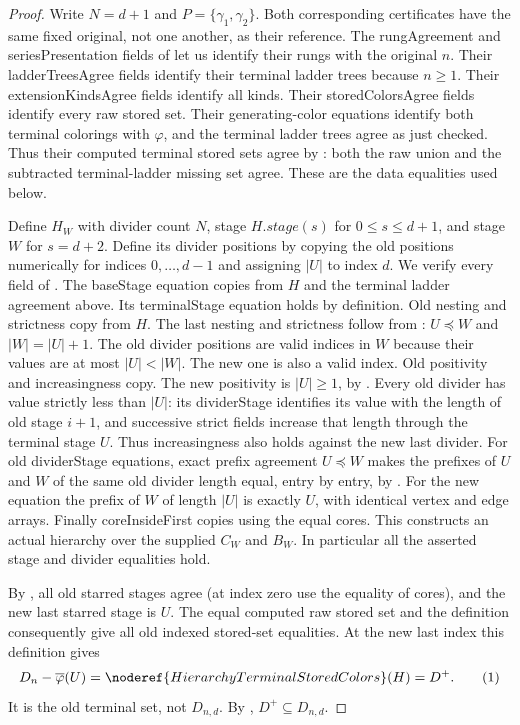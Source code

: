 \begin{proof}
Write $N=d+1$ and $P=\{\gamma_1,\gamma_2\}$. Both corresponding
certificates have the same fixed original, not one another, as their
reference. The rungAgreement and seriesPresentation fields of
 let us identify their
rungs with the original $n$. Their ladderTreesAgree fields identify
their terminal ladder trees because $n\ge1$. Their extensionKindsAgree
fields identify all kinds. Their storedColorsAgree fields identify
every raw stored set. Their generating-color equations identify both
terminal colorings with $\varphi$, and the terminal ladder trees agree
as just checked. Thus their computed terminal stored sets agree by
: both the raw union and the subtracted
terminal-ladder missing set agree. These are the data equalities used below.

Define $H_W$ with divider count $N$, stage $H.\mathit{stage}(s)$ for
$0\le s\le d+1$, and stage $W$ for $s=d+2$.
Define its divider positions by copying the old positions numerically
for indices $0,\ldots,d-1$ and assigning $|U|$ to index $d$.
We verify every field of .
The baseStage equation copies from $H$ and the terminal ladder
agreement above. Its terminalStage equation holds by definition.
Old nesting and strictness copy from $H$. The last nesting and
strictness follow from :
$U\preccurlyeq W$ and $|W|=|U|+1$.
The old divider positions are valid indices in $W$ because their
values are at most $|U|<|W|$. The new one is also a valid index.
Old positivity and increasingness copy. The new positivity is
$|U|\ge1$, by . Every old divider has value
strictly less than $|U|$: its dividerStage identifies its value with
the length of old stage $i+1$, and successive strict fields increase
that length through the terminal stage $U$. Thus increasingness also
holds against the new last divider.
For old dividerStage equations, exact prefix agreement $U\preccurlyeq W$
makes the prefixes of $U$ and $W$ of the same old divider length equal,
entry by entry, by . For the new equation
the prefix of $W$ of length $|U|$ is exactly $U$, with identical vertex
and edge arrays. Finally coreInsideFirst copies using the equal cores.
This constructs an actual hierarchy over the supplied $C_W$ and $B_W$.
In particular all the asserted stage and divider equalities hold.

By , all old starred stages agree
(at index zero use the equality of cores), and the new last starred
stage is $U$. The equal computed raw stored set and the definition
 consequently give all old indexed
stored-set equalities. At the new last index this definition gives
\[
 D_n-\overline\varphi(U)
       =\noderef{HierarchyTerminalStoredColors}(H)=D^+ .       \tag{1}
\]
It is the old terminal set, not $D_{n,d}$.
By ,
$D^+\subseteq D_{n,d}$.


\end{proof}
